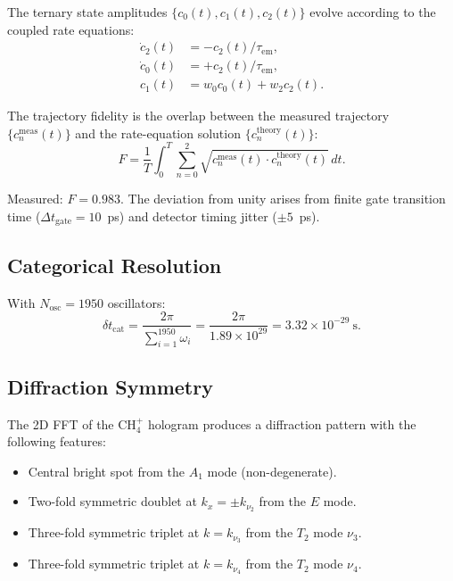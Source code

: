 \documentclass[11pt,twocolumn,a4paper]{article}
\theoremstyle{definition}
\theoremstyle{remark}
\begin{document}
The ternary state amplitudes $\{c_0(t), c_1(t), c_2(t)\}$ evolve according to the coupled rate equations:
\begin{align}
\dot{c}_2(t) &= -c_2(t)/\tau_{\mathrm{em}}, \\
\dot{c}_0(t) &= +c_2(t)/\tau_{\mathrm{em}}, \\
c_1(t) &= w_0 c_0(t) + w_2 c_2(t).
\end{align}

The trajectory fidelity is the overlap between the measured trajectory $\{c_n^{\mathrm{meas}}(t)\}$ and the rate-equation solution $\{c_n^{\mathrm{theory}}(t)\}$:
\begin{equation}
F = \frac{1}{T} \int_0^T \sum_{n=0}^2 \sqrt{c_n^{\mathrm{meas}}(t) \cdot c_n^{\mathrm{theory}}(t)} \, dt.
\end{equation}

Measured: $F = 0.983$. The deviation from unity arises from finite gate transition time ($\Delta t_{\mathrm{gate}} = 10$~ps) and detector timing jitter ($\pm 5$~ps).

\subsection{Categorical Resolution}

With $N_{\mathrm{osc}} = 1950$ oscillators:
\begin{equation}
\delta t_{\mathrm{cat}} = \frac{2\pi}{\sum_{i=1}^{1950} \omega_i} = \frac{2\pi}{1.89 \times 10^{29}} = 3.32 \times 10^{-29}~\mathrm{s}.
\end{equation}

\subsection{Diffraction Symmetry}

The 2D FFT of the CH$_4^+$ hologram produces a diffraction pattern with the following features:
\begin{itemize}
  \item Central bright spot from the $A_1$ mode (non-degenerate).
  \item Two-fold symmetric doublet at $k_x = \pm k_{\nu_2}$ from the $E$ mode.
  \item Three-fold symmetric triplet at $k = k_{\nu_3}$ from the $T_2$ mode $\nu_3$.
  \item Three-fold symmetric triplet at $k = k_{\nu_4}$ from the $T_2$ mode $\nu_4$.
\end{itemize}
\end{document}
